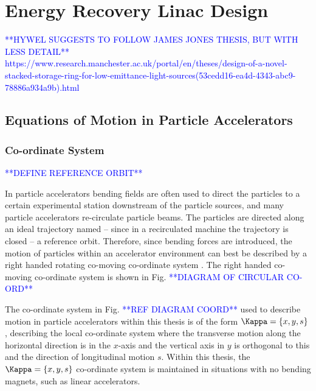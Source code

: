\documentclass[../main.tex]{subfiles}
\begin{document}
\chapter{Energy Recovery Linac Design}
\label{Energy_Recovery_Linac_Design} %

\textcolor{blue}{**HYWEL SUGGESTS TO FOLLOW JAMES JONES THESIS, BUT WITH LESS DETAIL**}
\textcolor{blue}{https://www.research.manchester.ac.uk/portal/en/theses/design-of-a-novel-stacked-storage-ring-for-low-emittance-light-sources(53cedd16-ea4d-4343-abc9-78886a934a9b).html}


\section{Equations of Motion in Particle Accelerators}

\subsection{Co-ordinate System}
\textcolor{blue}{**DEFINE REFERENCE ORBIT**}

In particle accelerators bending fields are often used to direct the particles to a certain experimental station downstream of the particle sources, and many particle accelerators re-circulate particle beams. The particles are directed along an ideal trajectory named -- since in a recirculated machine the trajectory is closed -- a reference orbit. Therefore, since bending forces are introduced, the motion of particles within an accelerator environment can best be described by a right handed rotating co-moving co-ordinate system \cite{wille2000physics}. The right handed co-moving co-ordinate system is shown in Fig. \textcolor{blue}{**DIAGRAM OF CIRCULAR CO-ORD**}   

The co-ordinate system in Fig. \textcolor{blue}{**REF DIAGRAM COORD**} used to describe motion in particle accelerators within this thesis is of the form $\Kappa = \left\{x,y,s\right\}$, describing the local co-ordinate system where the transverse motion along the horizontal direction is in the $x$-axis and the vertical axis in $y$ is orthogonal to this and the direction of longitudinal motion $s$. Within this thesis, the $\Kappa = \left\{x,y,s\right\}$ co-ordinate system is maintained in situations with no bending magnets, such as linear accelerators.     
\end{document}

